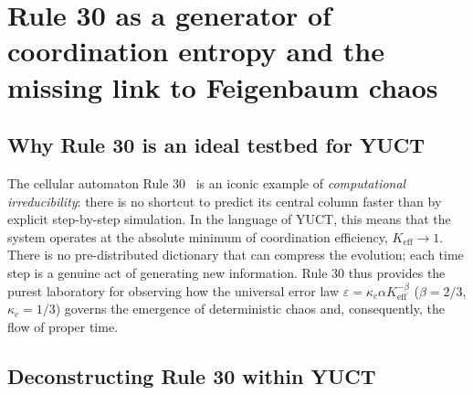 \documentclass[11pt,a4paper]{article}
\newcommand{\Keff}{K_{\mathrm{eff}}}
\begin{document}
	\section{Rule 30 as a generator of coordination entropy and the missing link to Feigenbaum chaos}
	\label{sec:rule30}
	
	\subsection{Why Rule 30 is an ideal testbed for YUCT}
	The cellular automaton Rule 30~\cite{Wolfram2002} is an iconic example of \textit{computational irreducibility}: there is no shortcut to predict its central column faster than by explicit step-by-step simulation. In the language of YUCT, this means that the system operates at the absolute minimum of coordination efficiency, \(\Keff \to 1\). There is no pre-distributed dictionary that can compress the evolution; each time step is a genuine act of generating new information. Rule 30 thus provides the purest laboratory for observing how the universal error law \(\varepsilon = \kappa_c \alpha \Keff^{-\beta}\) (\(\beta=2/3\), \(\kappa_c=1/3\)) governs the emergence of deterministic chaos and, consequently, the flow of proper time.
	
	\subsection{Deconstructing Rule 30 within YUCT}
	\label{subsec:deconstruction}
	
\end{document}
